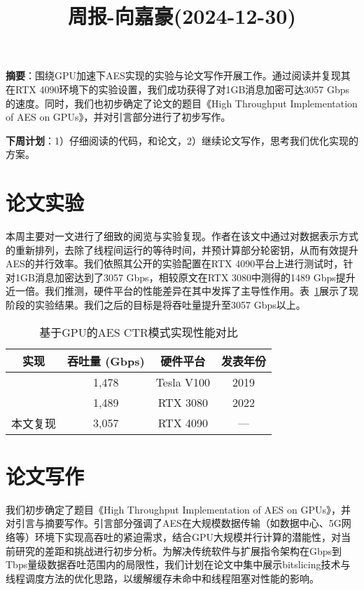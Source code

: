 \documentclass[11pt,a4paper]{article}
\title{周报-向嘉豪(2024-12-30)}
\renewcommand{\maketitle}{
  \begin{center}
    \LARGE\bfseries\thetitle
  \end{center}
}
\begin{document}
\maketitle

\noindent \textbf{摘要}：围绕GPU加速下AES实现的实验与论文写作开展工作。通过阅读\cite{Lee2022}并复现其在RTX 4090环境下的实验设置，我们成功获得了对1GB消息加密可达3057 Gbps的速度。同时，我们也初步确定了论文的题目《High Throughput Implementation of AES on GPUs》，并对引言部分进行了初步写作。

\vspace{1em}
\noindent \textbf{下周计划}：1）仔细阅读\cite{Lee2022}的代码，和\cite{Hajihassani2019}论文，2）继续论文写作，思考我们优化实现的方案。

\section{论文实验}

本周主要对\cite{Lee2022}一文进行了细致的阅览与实验复现。作者在该文中通过对数据表示方式的重新排列，去除了线程间运行的等待时间，并预计算部分轮密钥，从而有效提升AES的并行效率。我们依照其公开的实验配置在RTX 4090平台上进行测试时，针对1GB消息加密达到了3057 Gbps，相较\cite{Lee2022}原文在RTX 3080中测得的1489 Gbps提升近一倍。我们推测，硬件平台的性能差异在其中发挥了主导性作用。表~\ref{tab:aes_gpu_compare}展示了现阶段的实验结果。我们之后的目标是将吞吐量提升至3057 Gbps以上。

\begin{table}[htbp]
    \caption{基于GPU的AES CTR模式实现性能对比}
    \label{tab:aes_gpu_compare}
    \centering
    \begin{tabular}{cccc}
        \toprule
        \textbf{实现} & \textbf{吞吐量 (Gbps)} & \textbf{硬件平台} & \textbf{发表年份} \\
        \midrule
        \cite{Hajihassani2019} & 1,478 & Tesla V100 & 2019 \\
        \cite{Lee2022}        & 1,489 & RTX 3080   & 2022 \\
        本文复现    & 3,057 & RTX 4090   & --- \\
        \bottomrule
    \end{tabular}
\end{table}

\section{论文写作}
我们初步确定了题目《High Throughput Implementation of AES on GPUs》，并对引言与摘要写作。引言部分强调了AES在大规模数据传输（如数据中心、5G网络等）环境下实现高吞吐的紧迫需求，结合GPU大规模并行计算的潜能性，对当前研究的差距和挑战进行初步分析。为解决传统软件与扩展指令架构在Gbps到Tbps量级数据吞吐范围内的局限性，我们计划在论文中集中展示bitslicing技术与线程调度方法的优化思路，以缓解缓存未命中和线程阻塞对性能的影响。



\end{document}
